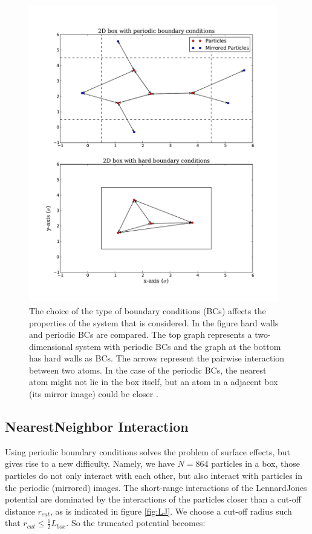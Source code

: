 \documentclass{article}
\begin{document}
\begin{figure}[!htb]
  \centering
    \includegraphics[height=130mm]{BC.pdf}
  \caption[]{The choice of the type of boundary conditions (BCs) affects the properties of the system that is considered. In the figure hard walls and periodic BCs are compared. The top graph represents a two-dimensional system with periodic BCs and the graph at the bottom has hard walls as BCs. The arrows represent the pairwise interaction between two atoms. In the case of the periodic BCs, the nearest atom might not lie in the box itself, but an atom in a adjacent box (its mirror image) could be closer .}
  \label{fig:BC}
\end{figure}

\subsection{Nearest\text{-}Neighbor Interaction}
Using periodic boundary conditions solves the problem of surface effects, but gives rise to a new difficulty. Namely, we have $N=864$ particles in a box, those particles do not only interact with each other, but also interact with particles in the periodic (mirrored) images. The short-range interactions of the Lennard\text{-}Jones potential are dominated by the interactions of the particles closer than a cut-off distance $r_{cut}$, as is indicated in figure \ref{fig:LJ}. We choose a cut-off radius such that $r_{cut} \le \frac{1}{2}L_{box}$. So the truncated potential becomes:
\end{document}
